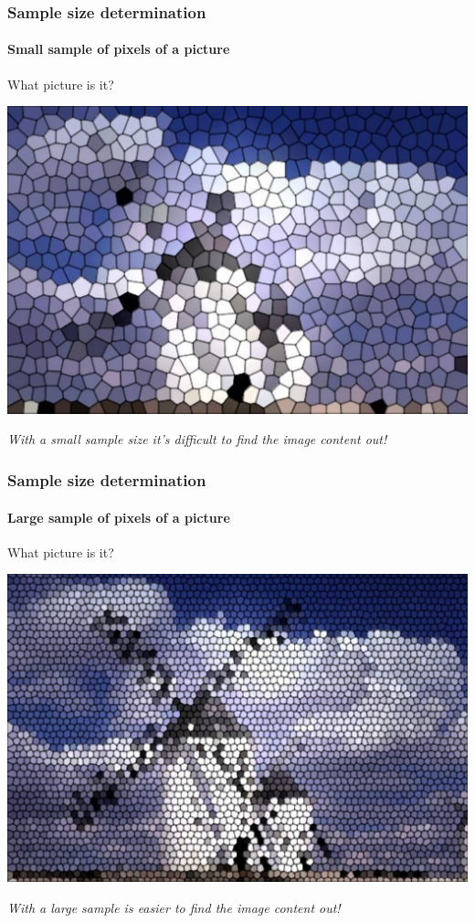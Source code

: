 \begin{frame}
\frametitle{Sample size determination}
\framesubtitle{Small sample of pixels of a picture}
\begin{center}
What picture is it?

\includegraphics[scale=0.45]{img/introduction/sample_windmill1.pdf}

\emph{With a small sample size it's difficult to find the image content out!}
\end{center}
\end{frame}


\begin{frame}
\frametitle{Sample size determination}
\framesubtitle{Large sample of pixels of a picture}
\begin{center}
What picture is it?

\includegraphics[scale=0.45]{img/introduction/sample_windmill2.pdf}

\emph{With a large sample is easier to find the image content out!}
\end{center}
\end{frame}


